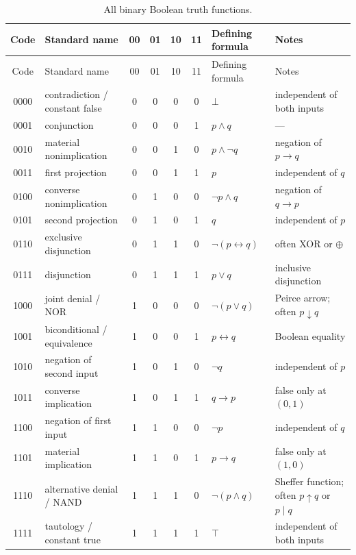 \begingroup\scriptsize\setlength{\tabcolsep}{3pt}
\begin{longtable}{@{}c p{} cccc p{}p{}@{}}
\caption{All binary Boolean truth functions.}
\label{tab:p01-sixteen}\\
\toprule
Code & Standard name & 00 & 01 & 10 & 11 & Defining formula & Notes \\
\midrule
\endfirsthead
\toprule
Code & Standard name & 00 & 01 & 10 & 11 & Defining formula & Notes \\
\midrule
\endhead
0000 & contradiction / constant false & 0&0&0&0 & \(\bot\) & independent of both inputs \\
0001 & conjunction & 0&0&0&1 & \(p\land q\) & --- \\
0010 & material nonimplication & 0&0&1&0 & \(p\land\neg q\) & negation of \(p\to q\) \\
0011 & first projection & 0&0&1&1 & \(p\) & independent of \(q\) \\
0100 & converse nonimplication & 0&1&0&0 & \(\neg p\land q\) & negation of \(q\to p\) \\
0101 & second projection & 0&1&0&1 & \(q\) & independent of \(p\) \\
0110 & exclusive disjunction & 0&1&1&0 & \(\neg(p\leftrightarrow q)\) & often XOR or \(\oplus\) \\
0111 & disjunction & 0&1&1&1 & \(p\lor q\) & inclusive disjunction \\
1000 & joint denial / NOR & 1&0&0&0 & \(\neg(p\lor q)\) & Peirce arrow; often \(p\downarrow q\) \\
1001 & biconditional / equivalence & 1&0&0&1 & \(p\leftrightarrow q\) & Boolean equality \\
1010 & negation of second input & 1&0&1&0 & \(\neg q\) & independent of \(p\) \\
1011 & converse implication & 1&0&1&1 & \(q\to p\) & false only at \((0,1)\) \\
1100 & negation of first input & 1&1&0&0 & \(\neg p\) & independent of \(q\) \\
1101 & material implication & 1&1&0&1 & \(p\to q\) & false only at \((1,0)\) \\
1110 & alternative denial / NAND & 1&1&1&0 & \(\neg(p\land q)\) & Sheffer function; often \(p\uparrow q\) or \(p\mid q\) \\
1111 & tautology / constant true & 1&1&1&1 & \(\top\) & independent of both inputs \\
\bottomrule
\end{longtable}
\endgroup

